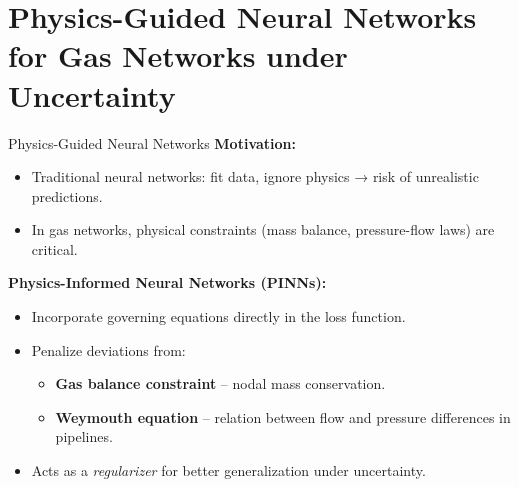 \documentclass[hyperref={colorlinks,citecolor=blue,linkcolor=blue,urlcolor=blue}]{beamer}
\begin{document}
\section{Physics-Guided Neural Networks for Gas Networks under Uncertainty}
\begin{frame}{Physics-Guided Neural Networks}
\footnotesize
\textbf{Motivation:}
\begin{itemize}
    \item Traditional neural networks: fit data, ignore physics → risk of unrealistic predictions.
    \item In gas networks, physical constraints (mass balance, pressure-flow laws) are critical.
\end{itemize}

\textbf{Physics-Informed Neural Networks (PINNs):}
\begin{itemize}
    \item Incorporate governing equations directly in the loss function.
    \item Penalize deviations from:
    \begin{itemize}
        \item \textbf{Gas balance constraint} – nodal mass conservation.
        \item \textbf{Weymouth equation} – relation between flow and pressure differences in pipelines.
    \end{itemize}
    \item Acts as a \emph{regularizer} for better generalization under uncertainty.
\end{itemize}

\end{frame}
\end{document}
